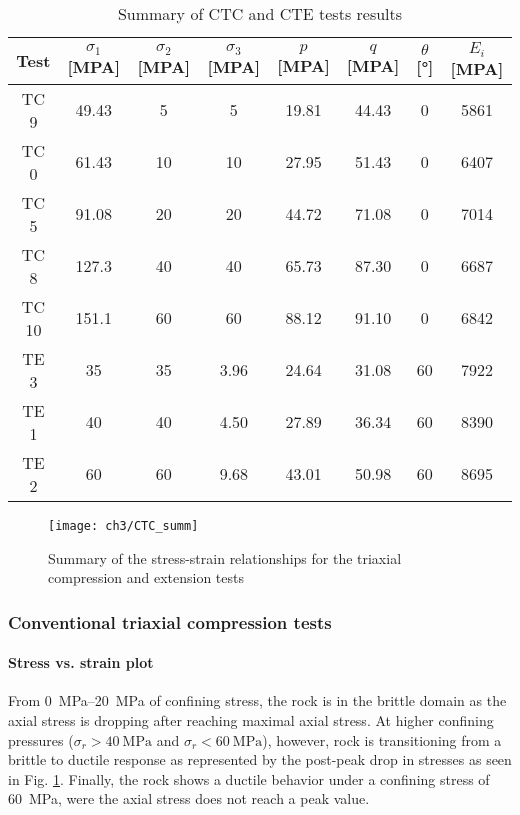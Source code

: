 \begin{table}
    \centering
    \begin{tabular}{cccccccc}
        \hline 
        Test & $\sigma_1$ [\si{MPA}] & $\sigma_2$ [\si{MPA}] &$\sigma_3$ [\si{MPA}] & $p$ [\si{MPA}] & $q$ [\si{MPA}] & $\theta$ [\si{\degree}] & $E_i$ [\si{MPA}] \\
        \hline
        \hline
        TC 9  & 49.43 & 5  & 5    & 19.81 & 44.43 & 0  & 5861  \\ 
        TC 0  & 61.43 & 10 & 10   & 27.95 & 51.43 & 0  & 6407  \\ 
        TC 5  & 91.08 & 20 & 20   & 44.72 & 71.08 & 0  & 7014  \\ 
        TC 8  & 127.3 & 40 & 40   & 65.73 & 87.30 & 0  & 6687  \\ 
        TC 10 & 151.1 & 60 & 60   & 88.12 & 91.10 & 0  & 6842  \\ 
        \hline
        \hline
        TE 3  & 35    & 35 & 3.96 & 24.64 & 31.08 & 60 & 7922  \\ 
        TE 1  & 40    & 40 & 4.50 & 27.89 & 36.34 & 60 & 8390  \\ 
        TE 2  & 60    & 60 & 9.68 & 43.01 & 50.98 & 60 & 8695  \\
        \hline
    \end{tabular}
    \caption{Summary of CTC and CTE tests results}
    \label{tb3:CTC-CTE-results}
\end{table}

\begin{figure}[tb]
    \centering
    \texttt{[image: ch3/CTC\_summ]}
    \caption{Summary of the stress-strain relationships for the triaxial compression and extension tests}
    \label{fig3:8}
\end{figure} 

\subsubsection{Conventional triaxial compression tests}

\paragraph{Stress vs. strain plot}
From \SIrange{0}{20}{MPa} of confining stress, the rock is in the brittle domain as the axial stress is dropping after reaching maximal axial stress. At higher confining pressures ($\sigma_r > \SI{40}{\mega\pascal}$ and $\sigma_r < \SI{60}{\mega\pascal}$), however, rock is transitioning from a brittle to ductile response as represented by the post-peak drop in stresses as seen in Fig. \ref{fig3:8}. Finally, the rock shows a ductile behavior under a confining stress of \SI{60}{MPa}, were the axial stress does not reach a peak value.

